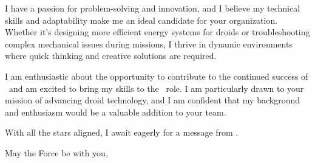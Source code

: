 \documentclass[10pt, a4paper]{article}
\begin{document}
I have a passion for problem-solving and innovation, and I believe my technical skills and adaptability make me an ideal candidate for your organization. Whether it’s designing more efficient energy systems for droids or troubleshooting complex mechanical issues during missions, I thrive in dynamic environments where quick thinking and creative solutions are required.

I am enthusiastic about the opportunity to contribute to the continued success of \COMPANY\ and am excited to bring my skills to the \ROLE\ role. I am particularly drawn to your mission of advancing droid technology, and I am confident that my background and enthusiasm would be a valuable addition to your team.

With all the stars aligned, I await eagerly for a message from \COMPANY.

\bigskip

May the Force be with you,

\vspace{10pt}

\name
\end{document}
